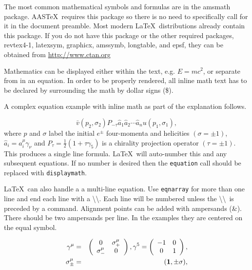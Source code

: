 \documentclass[preprint2]{aastex63}
\newcommand\aastex{AAS\TeX}
\newcommand\latex{La\TeX}
\begin{document}
The most common mathematical symbols and formulas are in the amsmath
package.  \aastex\ requires this package so there is no need to
specifically call for it in the document preamble.  Most modern \latex\
distributions already contain this package.  If you do not have this
package or the other required packages, revtex4-1, latexsym, graphicx,
amssymb, longtable, and epsf, they can be obtained from 
\url{http://www.ctan.org}

Mathematics can be displayed either within the text, e.g. $E = mc^2$, or
separate from in an equation.  In order to be properly rendered, all inline
math text has to be declared by surrounding the math by dollar signs (\$).

A complex equation example with inline math as part of the explanation
follows.

\begin{equation}
\bar v(p_2,\sigma_2)P_{-\tau}\hat a_1\hat a_2\cdots
\hat a_nu(p_1,\sigma_1) ,
\end{equation}
where $p$ and $\sigma$ label the initial $e^{\pm}$ four-momenta
and helicities $(\sigma = \pm 1)$, $\hat a_i=a^\mu_i\gamma_\nu$
and $P_\tau=\frac{1}{2}(1+\tau\gamma_5)$ is a chirality projection
operator $(\tau = \pm1)$.  This produces a single line formula.  \latex\ will
auto-number this and any subsequent equations.  If no number is desired then
the {\tt\string equation} call should be replaced with {\tt\string displaymath}.

\latex\ can also handle a a multi-line equation.  Use {\tt\string eqnarray}
for more than one line and end each line with a
\textbackslash\textbackslash.  Each line will be numbered unless the
\textbackslash\textbackslash\ is preceded by a {\tt\string\nonumber}
command.  Alignment points can be added with ampersands (\&).  There should be
two ampersands per line. In the examples they are centered on the equal
symbol.

\begin{eqnarray}
\gamma^\mu  & = &
 \left(
\begin{array}{cc}
0 & \sigma^\mu_+ \\
\sigma^\mu_- & 0
\end{array}     \right) ,
 \gamma^5= \left(
\begin{array}{cc}
-1 &   0\\
0 &   1
\end{array}     \right)  , \\
\sigma^\mu_{\pm}  & = &   ({\bf 1} ,\pm \sigma) , 
\end{eqnarray}
\end{document}
